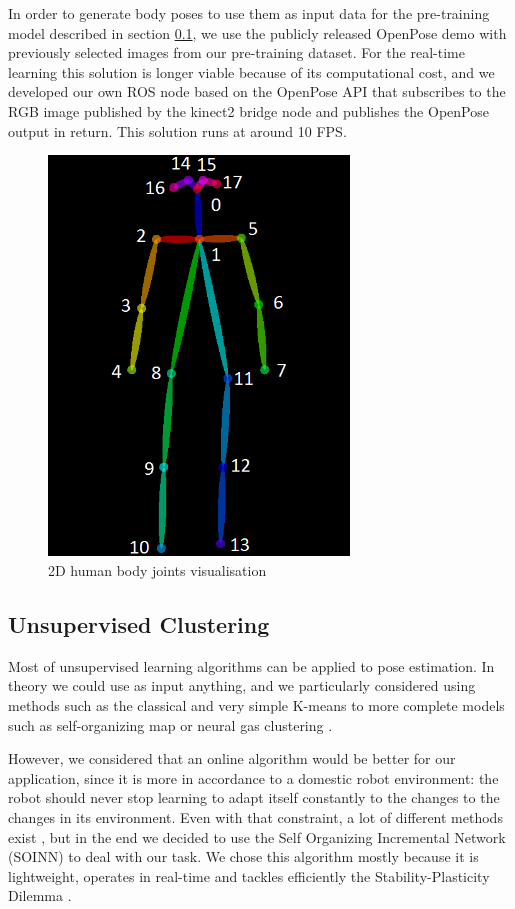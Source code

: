 In order to generate body poses to use them as input data for the pre-training model described in section \ref{section:SOINN}, we use the publicly released OpenPose demo with previously selected images from our pre-training dataset. For the real-time learning this solution is longer viable because of its computational cost, and we developed our own ROS node based on the OpenPose API that subscribes to the RGB image published by the kinect2 bridge node and publishes the OpenPose output in return. This solution runs at around 10 FPS.

\begin{figure}[ht]
    \centering
    \includegraphics[width=80mm, keepaspectratio]{images/2D_body_joints_visualisation.png}
    \caption{2D human body joints visualisation}
    \label{fig:2D_joints_vis}
\end{figure}

\subsection{Unsupervised Clustering}
\label{section:SOINN}
Most of unsupervised learning algorithms can be applied to pose estimation. In theory we could use as input anything, and we particularly considered using methods such as the classical and very simple K-means \cite{k_means} to more complete models such as self-organizing map \cite{self_organizing_map} or neural gas clustering \cite{neural_gas}.

However, we considered that an online algorithm would be better for our application, since it is more in accordance to a domestic robot environment: the robot should never stop learning to adapt itself constantly to the changes to the changes in its environment. Even with that constraint, a lot of different methods exist \cite{online_clustering_algo}, but in the end we decided to use the Self Organizing Incremental Network (SOINN) \cite{SOINN} to deal with our task. We chose this algorithm mostly because it is lightweight, operates in real-time and tackles efficiently the Stability-Plasticity Dilemma \cite{stability-plasticity_dilemma}. 

